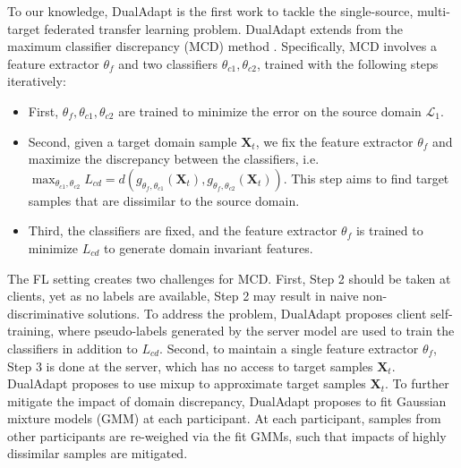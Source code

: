 \documentclass[11pt]{article}
\begin{document}
To our knowledge, DualAdapt \cite{Yilun-yao2022federated} is the first work to tackle the single-source, multi-target federated transfer learning problem. DualAdapt extends from the maximum classifier discrepancy (MCD) method \cite{Yilun-saito2018maximum}. Specifically, MCD involves a feature extractor $\theta_f$ and two classifiers $\theta_{c1}, \theta_{c2}$, trained with the following steps iteratively:
\begin{itemize}
    \item First, $\theta_f, \theta_{c1}, \theta_{c2}$ are trained to minimize the error on the source domain $\mathcal{L}_1$.
    \item Second, given a target domain sample $\mathbf{X}_t$, we fix the feature extractor $\theta_f$ and maximize the discrepancy between the classifiers, i.e. $\max_{\theta_{c1}, \theta_{c2}}L_{cd} = d(g_{\theta_f, \theta_{c1}}(\mathbf{X}_t), g_{\theta_f, \theta_{c2}}(\mathbf{X}_t))$. This step aims to find target samples that are dissimilar to the source domain.
    \item Third, the classifiers are fixed, and the feature extractor $\theta_f$ is trained to minimize $L_{cd}$ to generate domain invariant features.
\end{itemize}
The FL setting creates two challenges for MCD. First, Step 2 should be taken at clients, yet as no labels are available, Step 2 may result in naive non-discriminative solutions. To address the problem, DualAdapt proposes client self-training, where pseudo-labels generated by the server model are used to train the classifiers in addition to $L_{cd}$. Second, to maintain a single feature extractor $\theta_f$, Step 3 is done at the server, which has no access to target samples $\mathbf{X}_t$. DualAdapt proposes to use mixup \cite{Yilun-zhang2017mixup} to approximate target samples $\mathbf{X}_t$. To further mitigate the impact of domain discrepancy, DualAdapt proposes to fit Gaussian mixture models (GMM) at each participant. At each participant, samples from other participants are re-weighed via the fit GMMs, such that impacts of highly dissimilar samples are mitigated.
\end{document}
